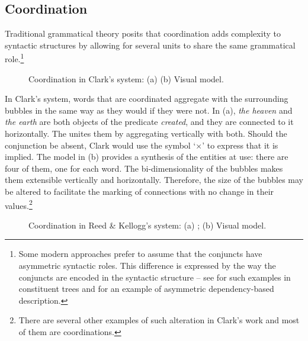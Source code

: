 \documentclass[output=paper]{langsci/langscibook}
\begin{document}
\subsection{Coordination}

Traditional grammatical theory posits that coordination adds complexity to syntactic structures by allowing for several units to share the same grammatical role.\footnote{\textrm{Some modern approaches prefer to assume that the conjuncts have asymmetric syntactic roles. This difference is expressed by the way the conjuncts are encoded in the syntactic structure – see \citet{mouret_grammaire_2007} for such examples in constituent trees and \citet[50-51]{polguere_dependency_2009} for an example of asymmetric dependency-based description.}} 

\begin{figure}
    \caption{Coordination in Clark’s system: (a) \citet[24]{clark_science_1847} (b) Visual model.\label{fig:4:7}}    
\end{figure}
 



In Clark’s system, words that are coordinated aggregate with the surrounding bubbles in the same way as they would if they were not. In (a), \textit{the heaven} and \textit{the earth} are both objects of the predicate \textit{created}, and they are connected to it horizontally. The  unites them by aggregating vertically with both. Should the conjunction be absent, Clark would use the symbol ‘×’ to express that it is implied. The model in (b) provides a synthesis of the entities at use: there are four of them, one for each word. The bi-dimensionality of the bubbles makes them extensible vertically and horizontally. Therefore, the size of the bubbles may be altered to facilitate the marking of connections with no change in their values.\footnote{\textrm{\textsuperscript{} }\textrm{There are several other examples of such alteration in Clark’s work and most of them are coordinations.} } 


\begin{figure}
    \caption{Coordination in Reed \& Kellogg’s system: (a) \citeyear[48]{reed_graded_1879}; (b) Visual model.\label{fig:4:8}}    
\end{figure}
\end{document}

